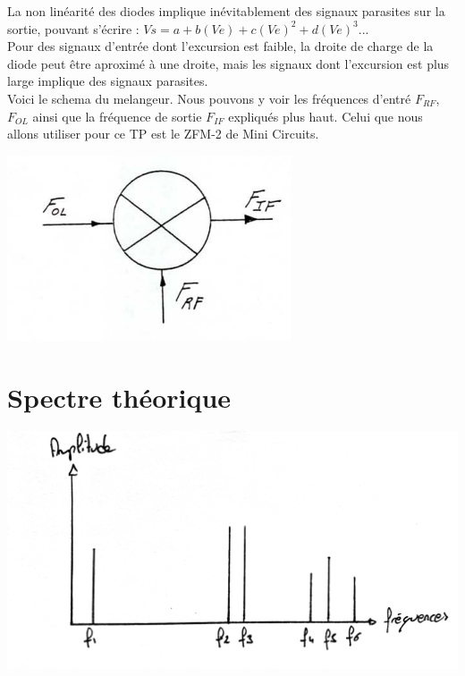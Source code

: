 \documentclass[a4paper,12pt]{report}            %
\begin{document}
    La non linéarité des diodes implique inévitablement des signaux parasites sur la sortie,
pouvant s'écrire : $Vs = a + b(Ve) + c(Ve)^{2} + d(Ve)^{3} ...$\\
    Pour des signaux d'entrée dont l'excursion est faible, la  droite de charge de la diode peut 
être aproximé à une droite, mais les signaux dont l'excursion est plus large implique des signaux parasites.\\
    Voici le schema du melangeur. Nous pouvons y voir les fréquences d'entré $F_{RF}$, $F_{OL}$ ainsi que la
fréquence de sortie $F_{IF}$ expliqués plus haut. Celui que nous allons utiliser pour ce TP est le ZFM-2 de Mini Circuits.\\
\begin{center}\includegraphics[scale = 0.4]{pic/mixer_logo.png}\\ \end{center}

\section{Spectre théorique}

\begin{center}\includegraphics[scale = 0.25]{pic/Spectre_theorique.png}\\ \end{center}
\end{document}
